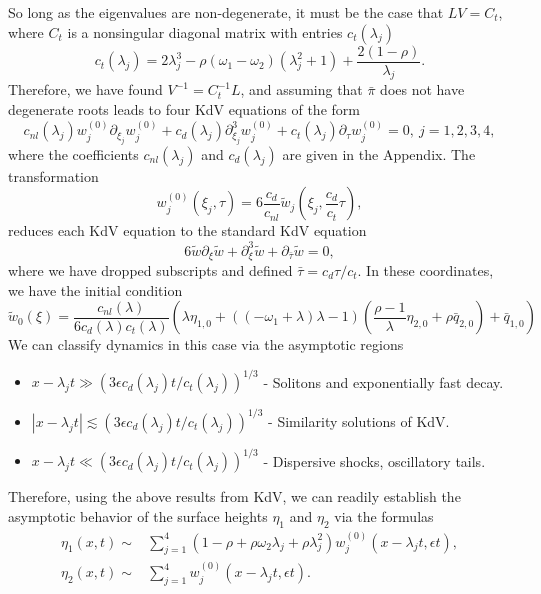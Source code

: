 \documentclass[a4paper,11pt]{article}
\newcommand{\p}{\partial}
\begin{document}
So long as the eigenvalues are non-degenerate, it must be the case that $LV = C_{t}$, where $C_{t}$ is a nonsingular diagonal matrix with entries $c_{t}(\lambda_{j})$
\[
c_{t}(\lambda_{j}) = 2\lambda_{j}^{3}-\rho(\omega_{1}-\omega_{2})(\lambda_{j}^{2}+1) +\frac{2(1-\rho)}{\lambda_{j}}.
\]
Therefore, we have found $V^{-1} = C_{t}^{-1}L$, and assuming that $\bar{\pi}$ does not have degenerate roots leads to four KdV equations of the form 
\[
c_{nl}(\lambda_{j})w^{(0)}_{j}\p_{\xi_{j}}w^{(0)}_{j} + c_{d}(\lambda_{j})\p_{\xi_{j}}^{3}w^{(0)}_{j} + c_{t}(\lambda_{j}) \p_{\tau}w^{(0)}_{j} = 0, ~ j=1,2,3,4,
\]
where the coefficients $c_{nl}(\lambda_{j})$ and $c_{d}(\lambda_{j})$ are given in the Appendix.  The transformation 
\[
w^{(0)}_{j}(\xi_{j},\tau) = 6\frac{c_{d}}{c_{nl}}\tilde{w}_{j}\left(\xi_{j},\frac{c_{d}}{c_{t}}\tau \right),
\]
reduces each KdV equation to the standard KdV equation 
\[
6\tilde{w}\p_{\xi}\tilde{w} + \p_{\xi}^{3}\tilde{w} + \p_{\bar{\tau}}\tilde{w} = 0, 
\]
where we have dropped subscripts and defined $\bar{\tau}=c_{d}\tau/c_{t}$.  In these coordinates, we have the initial condition
\[
\tilde{w}_{0}(\xi) = \frac{c_{nl}(\lambda)}{6c_{d}(\lambda)c_{t}(\lambda)}\left(\lambda\eta_{1,0} + \left((-\omega_{1}+\lambda)\lambda-1\right)\left(\frac{\rho-1}{\lambda}\eta_{2,0} +  \rho\bar{q}_{2,0}\right) + \bar{q}_{1,0} \right)
\]  
We can classify dynamics in this case via the asymptotic regions
\begin{itemize}
\item $x - \lambda_{j}t \gg (3\epsilon c_{d}(\lambda_{j})t/c_{t}(\lambda_{j}))^{1/3}$ - Solitons and exponentially fast decay.  
\item $|x-\lambda_{j}t| \lesssim (3\epsilon c_{d}(\lambda_{j})t/c_{t}(\lambda_{j}))^{1/3}$ - Similarity solutions of KdV.
\item $x-\lambda_{j}t \ll  (3\epsilon c_{d}(\lambda_{j})t/c_{t}(\lambda_{j}))^{1/3}$ - Dispersive shocks, oscillatory tails.   
\end{itemize}
Therefore, using the above results from KdV, we can readily establish the asymptotic behavior of the surface heights $\eta_{1}$ and $\eta_{2}$ via the formulas
\begin{align*}
\eta_{1}(x,t) \sim & \sum_{j=1}^{4}(1-\rho +\rho\omega_{2}\lambda_{j}+\rho\lambda_{j}^{2})w^{(0)}_{j}(x-\lambda_{j}t,\epsilon t),\\
\eta_{2}(x,t) \sim & \sum_{j=1}^{4}w^{(0)}_{j}(x-\lambda_{j}t,\epsilon t).
\end{align*}
\end{document}
